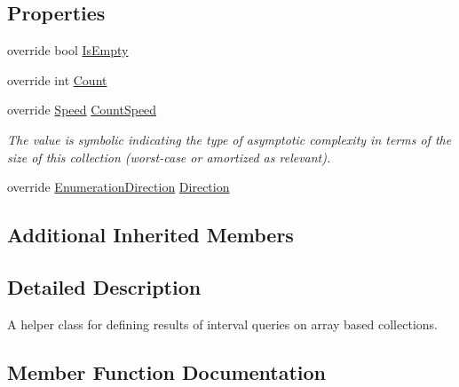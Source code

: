 \subsection*{Properties}
\begin{DoxyCompactItemize}
\item 
override bool \hyperlink{class_c5_1_1_array_base_1_1_range_afe1224ec6cd4b4a610c1a156d2a82539}{Is\+Empty}
\item 
override int \hyperlink{class_c5_1_1_array_base_1_1_range_acf73ad1c77ff0b7eee1894fd467baf88}{Count}
\item 
override \hyperlink{namespace_c5_a615ba88dcdaa8d5a3c5f833a73d7fad6}{Speed} \hyperlink{class_c5_1_1_array_base_1_1_range_abc096a489b1c0c705679b18c08cdfa02}{Count\+Speed}
\begin{DoxyCompactList}\small\item\em The value is symbolic indicating the type of asymptotic complexity in terms of the size of this collection (worst-\/case or amortized as relevant). \end{DoxyCompactList}\item 
override \hyperlink{namespace_c5_aad282676794e49130eb8caed289395f8}{Enumeration\+Direction} \hyperlink{class_c5_1_1_array_base_1_1_range_ad2a7c1b607ef9082829d9f71f3e459fe}{Direction}
\end{DoxyCompactItemize}
\subsection*{Additional Inherited Members}


\subsection{Detailed Description}
A helper class for defining results of interval queries on array based collections. 



\subsection{Member Function Documentation}
\hypertarget{class_c5_1_1_array_base_1_1_range_a296cf1453eb618368fdc14f7abc4f4c2}{}
